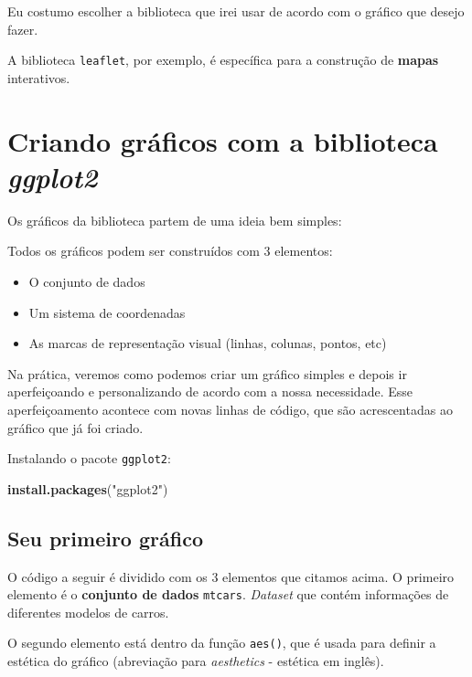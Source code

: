 \documentclass[
]{book}
\newenvironment{Shaded}{\begin{snugshade}}{\end{snugshade}}
\newcommand{\KeywordTok}[1]{\textcolor[rgb]{0.13,0.29,0.53}{\textbf{#1}}}
\newcommand{\NormalTok}[1]{#1}
\newcommand{\StringTok}[1]{\textcolor[rgb]{0.31,0.60,0.02}{#1}}
\providecommand{\tightlist}{%
  \setlength{\itemsep}{0pt}\setlength{\parskip}{0pt}}
\begin{document}
Eu costumo escolher a biblioteca que irei usar de acordo com o gráfico
que desejo fazer.

A biblioteca \texttt{leaflet}, por exemplo, é específica para a
construção de \textbf{mapas} interativos.

\hypertarget{criando-gruxe1ficos-com-a-biblioteca-ggplot2}{%
\section{\texorpdfstring{Criando gráficos com a biblioteca
\emph{ggplot2}}{Criando gráficos com a biblioteca ggplot2}}\label{criando-gruxe1ficos-com-a-biblioteca-ggplot2}}

Os gráficos da biblioteca partem de uma ideia bem simples:

Todos os gráficos podem ser construídos com 3 elementos:

\begin{itemize}
\tightlist
\item
  O conjunto de dados
\item
  Um sistema de coordenadas
\item
  As marcas de representação visual (linhas, colunas, pontos, etc)
\end{itemize}

Na prática, veremos como podemos criar um gráfico simples e depois ir
aperfeiçoando e personalizando de acordo com a nossa necessidade. Esse
aperfeiçoamento acontece com novas linhas de código, que são
acrescentadas ao gráfico que já foi criado.

Instalando o pacote \texttt{ggplot2}:

\begin{Shaded}
\begin{Highlighting}[]
\KeywordTok{install.packages}\NormalTok{(}\StringTok{"ggplot2"}\NormalTok{)}
\end{Highlighting}
\end{Shaded}

\hypertarget{seu-primeiro-gruxe1fico}{%
\subsection{Seu primeiro gráfico}\label{seu-primeiro-gruxe1fico}}

O código a seguir é dividido com os 3 elementos que citamos acima. O
primeiro elemento é o \textbf{conjunto de dados} \texttt{mtcars}.
\emph{Dataset} que contém informações de diferentes modelos de carros.

O segundo elemento está dentro da função \texttt{aes()}, que é usada
para definir a estética do gráfico (abreviação para \emph{aesthetics} -
estética em inglês).
\end{document}
